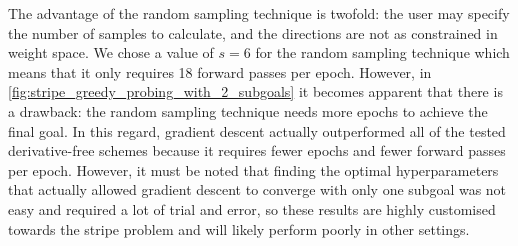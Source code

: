 The advantage of the random sampling technique is twofold: the user may specify the number of samples to calculate, and the directions are not as constrained in weight space.
We chose a value of $s=6$ for the random sampling technique which means that it only requires 18 forward passes per epoch.
However, in \ref{fig:stripe_greedy_probing_with_2_subgoals} it becomes apparent that there is a drawback: the random sampling technique needs more epochs to achieve the final goal.
In this regard, gradient descent actually outperformed all of the tested derivative-free schemes because it requires fewer epochs and fewer forward passes per epoch.
However, it must be noted that finding the optimal hyperparameters that actually allowed gradient descent to converge with only one subgoal was not easy and required a lot of trial and error, so these results are highly customised towards the stripe problem and will likely perform poorly in other settings.

